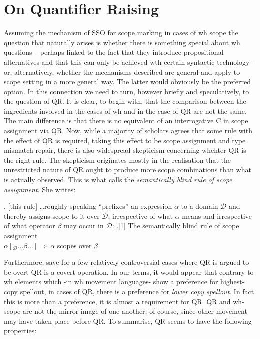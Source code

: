 \documentclass{glossa}
\begin{document}
\section{On Quantifier Raising}
Assuming the mechanism of SSO for scope marking in cases of wh scope the question that naturally arises is whether there is something special about wh questions -- perhaps linked to the fact that they introduce propositional alternatives and that this can only be achieved wth certain syntactic technology -- or, alternatively, whether the mechanisms described are general and apply to scope setting in a more general way.  The latter would obviously be the preferred option.  In this connection we need to turn, however briefly and speculatively, to the question of QR.  It is clear, to begin with, that the comparison between the ingredients involved in the cases of wh and in the case of QR are not the same.  The main difference is that there is no equivalent of an interrogative C in scope assignment via QR.  Now, while a majority of scholars agrees that some rule with the effect of QR is required, taking this effect to be scope assignment and type mismatch repair, there is also widespread skepticism concerning whehter QR is the right rule.  The skepticism originates mostly in the realisation that the unrestricted nature of QR ought to produce more scope combinations than what is actually observed. This is what\cite{szabolcsi:1997c} calls the
\emph{semantically blind rule of scope assignment}.  She writes:

\ex.  [this rule] \ldots roughly speaking ``prefixes'' an expression
$\alpha$ to a domain $\mathcal{D}$ and thereby assigns scope to it
over $\mathcal{D}$, irrespective of what $\alpha$ means and
irrespective of what operator $\beta$ may occur in $\mathcal{D}$:
\ex.[1] The semantically blind rule of scope assignment\\
 $\alpha[_{\mathcal{D}} \ldots \beta \ldots] \Rightarrow \
\alpha$ scopes over $ \beta$
\begin{flushright}
\cite[109]{szabolcsi:1997c}
\end{flushright}

Furthermore, save for a few relatively controversial cases where QR is argued to be overt \citep{fox-nissenbaum:99} QR is a covert operation.  In our terms, it would appear that contrary to wh elements which -in wh movement languages- show a preference for highest-copy spellout, in cases of QR, there is a preference for  \textit{lower copy spellout}.  In fact this is more than a preference, it is almost a requirement for QR.  QR and wh-scope are not the mirror image of one another, of course, since other movement may have taken place before QR.  To summarise, QR seems to have the following properties:
\end{document}
